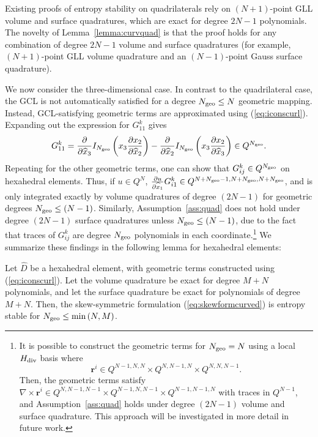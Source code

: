 \documentclass{svjour3}                     %
\renewcommand{\hat}{\widehat}
\newcommand{\pd}[2]{\frac{\partial#1}{\partial#2}}
\newcommand{\LRp}[1]{\left( #1 \right)}
\newcommand{\Grad} {\ensuremath{\nabla}}
\begin{document}
Existing proofs of entropy stability on quadrilaterals rely on $(N+1)$-point GLL volume and surface quadratures, which are exact for degree $2N-1$ polynomials.   The novelty of Lemma~\ref{lemma:curvquad} is that the proof holds for any combination of degree $2N-1$ volume and surface quadratures (for example, $(N+1)$-point GLL volume quadrature and an $(N-1)$-point Gauss surface quadrature).  

We now consider the three-dimensional case.  In contrast to the quadrilateral case, the GCL is not automatically satisfied for a degree $N_{\rm geo} \leq N$ geometric mapping.  Instead, GCL-satisfying geometric terms are approximated using (\ref{eq:iconscurl}).  Expanding out the expression for $G^k_{11}$ gives
\[
G^k_{11} = \pd{}{\hat{x}_3} I_{N_{\rm geo}}\LRp{{x}_3 \pd{x_2}{\hat{x}_2}} - \pd{}{\hat{x}_2} I_{N_{\rm geo}}\LRp{{x}_3 \pd{x_2}{\hat{x}_3}} \in Q^{N_{\rm geo}}.
\]
Repeating for the other geometric terms, one can show that $G^k_{ij} \in Q^{N_{\rm geo}}$ on hexahedral elements.  Thus, if $u\in Q^N$, $\pd{u}{\hat{x}_1} G^k_{i1} \in Q^{N+N_{\rm geo}-1,N+N_{\rm geo},N+N_{\rm geo}}$, and is only integrated exactly by volume quadratures of degree $(2N-1)$ for geometric degrees $N_{\rm geo}\leq (N-1)$.  Similarly, Assumption~\ref{ass:quad} does not hold under degree $(2N-1)$ surface quadratures unless $N_{\rm geo} \leq (N-1)$, due to the fact that traces of $G^k_{ij}$ are degree $N_{\rm geo}$ polynomials in each coordinate.\footnote{It is possible to  construct the geometric terms for $N_{\rm geo} = N$ using a local $H_{\rm div}$ basis where 
\[
\bm{r}^i \in Q^{N-1,N,N} \times Q^{N,N-1,N} \times Q^{N,N,N-1}.
\]  
Then, the geometric terms satisfy $\Grad \times \bm{r}^i \in Q^{N,N-1,N-1}\times Q^{N-1,N,N-1} \times Q^{N-1,N-1,N}$ with traces in $Q^{N-1}$, and Assumption~\ref{ass:quad} holds under degree $(2N-1)$ volume and surface quadrature.  This approach will be investigated in more detail in future work.  %
}
We summarize these findings in the following lemma for hexahedral elements:
\begin{lemma}
Let $\hat{D}$ be a hexahedral element, with geometric terms constructed using (\ref{eq:iconscurl}).  Let the volume quadrature be exact for degree $M+N$ polynomials, and let the surface quadrature be exact for polynomials of degree $M+N$.  Then, the skew-symmetric formulation (\ref{eq:skewformcurved}) is entropy stable for $N_{\rm geo} \leq \min\LRp{N,M}$.
\label{lemma:curvquad}
\end{lemma}
\end{document}
